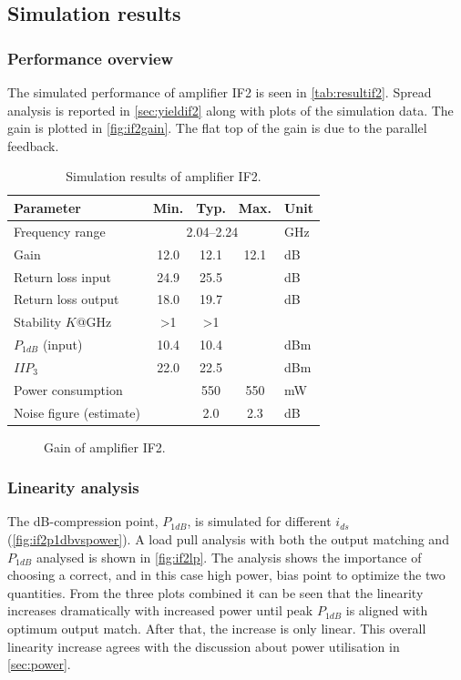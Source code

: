 		\subsection{Simulation results}
			\subsubsection{Performance overview}
				The simulated performance of amplifier IF2 is seen in \autoref{tab:resultif2}. Spread analysis is reported in \autoref{sec:yieldif2} along with plots of the simulation data. The gain is plotted in \autoref{fig:if2gain}. The flat top of the gain is due to the parallel feedback.

				\begin{table}[hbt!]
					\caption[Simulation results of amplifier IF2.]{Simulation results of amplifier IF2.\disclaimer}
					\label{tab:resultif2}
					\centering
					\begin{tabular}{ l c c c l }\toprule
						Parameter & Min. & Typ. & Max. & Unit \\\midrule
						Frequency range & \multicolumn{3}{c}{2.04--2.24} & GHz \\
						Gain & 12.0 & 12.1 & 12.1 & dB \\
						Return loss input & 24.9 & 25.5 &  & dB \\
						Return loss output & 18.0 & 19.7 &  & dB \\
						Stability $K$@\unit[0--70]{GHz} & >1 & >1 &  &  \\
						$P_{1dB}$ (input) & 10.4 & 10.4 &  & dBm \\
						$IIP_3$ & 22.0 & 22.5 &  & dBm \\
						Power consumption &  & 550 & 550 & mW \\
						Noise figure (estimate) &  & 2.0 & 2.3 & dB \\\bottomrule
					\end{tabular}
				\end{table}

				\begin{figure}[hbt!]
					\centering
					\caption[Amplifier IF2 gain.]{Gain of amplifier IF2.}\label{fig:if2gain}
				\end{figure}

			\subsubsection{Linearity analysis}
				The \unit[1]{dB}-compression point, $P_{1dB}$, is simulated for different $i_{ds}$ (\autoref{fig:if2p1dbvspower}). A load pull analysis with both the output matching and $P_{1dB}$ analysed is shown in \autoref{fig:if2lp}. The analysis shows the importance of choosing a correct, and in this case high power, bias point to optimize the two quantities. From the three plots combined it can be seen that the linearity increases dramatically with increased power until peak $P_{1dB}$ is aligned with optimum output match. After that, the increase is only linear. This overall linearity increase agrees with the discussion about power utilisation in \autoref{sec:power}.

